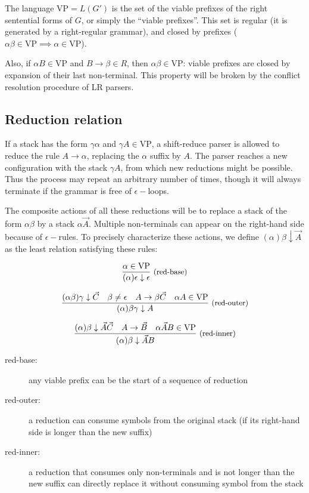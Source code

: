 \documentclass{article}
\begin{document}
\newcommand\VP{\text{VP}}
The language $\VP = L(G')$ is the set of the viable prefixes of the right sentential forms of $G$, or simply the ``viable prefixes''. This set is regular (it is generated by a right-regular grammar), and closed by prefixes ($\alpha\beta \in \VP \implies \alpha \in \VP$).

Also, if $\alpha B \in \VP$ and $B \rightarrow \beta \in R$, then $\alpha\beta \in \VP$: viable prefixes are closed by expansion of their last non-terminal. This property will be broken by the conflict resolution procedure of LR parsers.


\subsection{Reduction relation}

If a stack has the form $\gamma \alpha$ and $\gamma A \in \VP$, a shift-reduce parser is allowed to reduce the rule $A \rightarrow \alpha$, replacing the $\alpha$ suffix by $A$.
The parser reaches a new configuration with the stack $\gamma A$, from which new reductions might be possible. Thus the process may repeat an arbitrary number of times, though it will always terminate if the grammar is free of $\epsilon-$loops.

\newcommand\dred[3]{{(#1) #2 \downarrow #3}}
The composite actions of all these reductions will be to replace a stack of the form $\alpha \beta$ by a stack $\alpha \vec A$. Multiple non-terminals can appear on the right-hand side because of $\epsilon-$rules. To precisely characterize these actions, we define $\dred{\alpha}{\beta}{\vec A}$ as the least relation satisfying these rules:

\newcommand\Rule[3]{\frac{#1}{#2}\text{\small \ (#3)}}

\[\Rule
  {\alpha \in \VP}
  {\dred{\alpha}{\epsilon}{\epsilon}}
  {red-base}
\]

\[\Rule
  {\dred{\alpha\beta}{\gamma}{\vec C}
    \quad \beta \neq \epsilon
    \quad A \rightarrow \beta \vec C
    \quad \alpha A \in \VP}
  {\dred{\alpha}{\beta\gamma}{A}}
  {red-outer}
\]

\[\Rule
  {\dred{\alpha}{\beta}{\vec A \vec C}
    \quad A \rightarrow \vec B
    \quad\alpha \vec A B \in \VP}
  {\dred{\alpha}{\beta}{\vec A B}}
  {red-inner}
\]

\begin{description}
  \item[red-base:] any viable prefix can be the start of a sequence of reduction
  \item[red-outer:] a reduction can consume symbols from the original stack (if its right-hand side is longer than the new suffix)
  \item[red-inner:] a reduction that consumes only non-terminals and is not longer than the new suffix can directly replace it without consuming symbol from the stack
\end{description}
\end{document}
